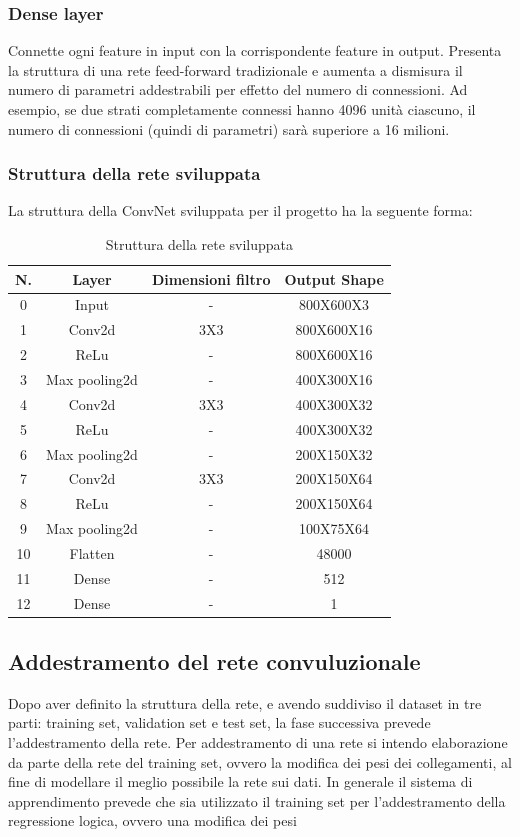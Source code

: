 \documentclass[14pt]{extarticle}
\begin{document}
\subsubsection{Dense layer}
Connette ogni feature in input con la corrispondente feature in output. Presenta la struttura di una rete feed-forward tradizionale e aumenta a dismisura il numero di parametri
addestrabili per effetto del numero di connessioni. Ad esempio, se due strati completamente connessi hanno 4096 unità ciascuno, il numero di connessioni (quindi di
parametri) sarà superiore a 16 milioni. \cite{aggarwal2018neural}
\subsubsection{Struttura della rete sviluppata}
La struttura della ConvNet sviluppata per il progetto ha la seguente forma:
\begin{table}
\centering
\begin{tabular}{cccc}
\hline
N. & Layer & Dimensioni filtro  & Output Shape\\
\hline\hline
0 & Input & - & 800X600X3\\
1 & Conv2d & 3X3 & 800X600X16\\
2 & ReLu & - & 800X600X16\\
3 & Max pooling2d & - & 400X300X16\\
4 & Conv2d & 3X3 & 400X300X32\\
5 & ReLu & - & 400X300X32\\
6 & Max pooling2d & - & 200X150X32\\
7 & Conv2d & 3X3 & 200X150X64\\
8 & ReLu & - & 200X150X64\\
9 & Max pooling2d &- &100X75X64\\
10 & Flatten &- &  48000\\
11 & Dense & - & 512\\
12 & Dense & - & 1\\
\hline
\end{tabular}
\caption{Struttura della rete sviluppata}
\label{fig:struttRete}
\end{table}
\subsection{Addestramento del rete convuluzionale}
Dopo aver definito la struttura della rete, e avendo suddiviso il dataset in tre parti: training set, validation set e test set, la fase successiva prevede l'addestramento della rete.
Per addestramento di una rete si intendo elaborazione da parte della  rete del training set, ovvero la modifica dei pesi dei collegamenti, al fine di modellare il meglio possibile la rete sui dati. 
In generale il sistema di apprendimento prevede che sia utilizzato il training set per l'addestramento della regressione logica, ovvero una modifica dei pesi 
\end{document}
